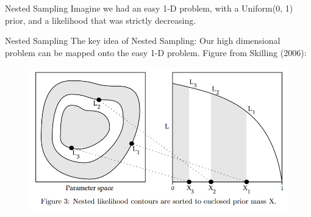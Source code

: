\documentclass{beamer}
\begin{document}
\begin{frame}[t]{Nested Sampling}
Imagine we had an easy 1-D problem, with a Uniform(0, 1) prior, and a likelihood
that was strictly decreasing.


\end{frame}


\begin{frame}[t]{Nested Sampling}
The key idea of Nested Sampling: Our high dimensional problem can be mapped
onto the easy 1-D problem. Figure from Skilling (2006):

\begin{figure}
\begin{center}
\includegraphics[scale=0.3]{figures/ns.png}
\end{center}
\end{figure}

\end{frame}
\end{document}
